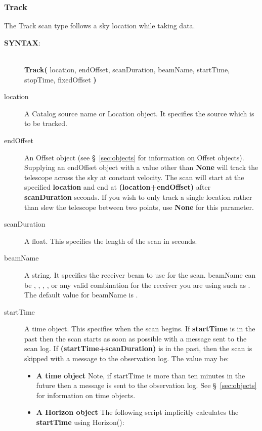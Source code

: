 
\subsubsection{Track}\label{section:track}

The Track scan type follows a sky location while taking data. 

\begin{description}
\item[{\bf SYNTAX}:]\ \\
{\bfseries{\textcolor{pythonKeywords}{Track}}(}
location, endOffset, scanDuration, beamName, startTime, stopTime, fixedOffset
{\bf)}

\item[location] A Catalog source name or Location object. It specifies the 
source which is to be tracked.
\item[endOffset] An Offset object (see \S~\ref{sec:objects} for information on
Offset objects).\\
Supplying an endOffset object with a value other than {\bf None} will track the
telescope across the sky at constant velocity.  The scan will start at
the specified {\bf location} and end at {\bf (location+endOffset)} after
{\bf scanDuration} seconds. If you wish to only track a single location rather
than slew the telescope between two points, use {\bf None} for this parameter.
\item[scanDuration] A float.  This specifies the length of the scan in seconds.
\item[beamName] A string. It specifies the receiver beam to use for the scan. 
beamName can be , , , ,  or any valid combination for the 
receiver you are using such as . The default value for beamName is .
\item[startTime] A time object.  This specifies when the scan begins. If 
{\bf startTime} is in the past then the scan starts as soon as possible with a 
message sent to the scan log. If {\bf (startTime+scanDuration)} is in 
the past, then the scan is skipped with a message to the observation log. 
The value may be:
\begin{itemize}
\item {\bf A time object}  Note, if startTime is more than ten minutes in 
the future then a message is sent to the observation log.
See \S~\ref{sec:objects} for information on time objects.
\item {\bf A Horizon object} The following script implicitly calculates the
{\bf startTime} using Horizon():


\end{itemize}
\end{description}
